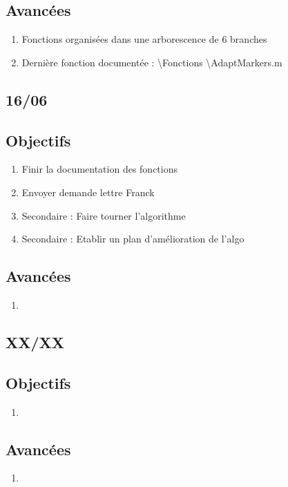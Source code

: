 \documentclass{article}
\begin{document}
\subsection*{\textbf{Avancées}}
\begin{enumerate}
    \item Fonctions organisées dans une arborescence de 6 branches
    \item Dernière fonction documentée : \textbackslash Fonctions \textbackslash AdaptMarkers.m
\end{enumerate}


\subsection*{16/06}

\subsection*{\textbf{Objectifs}}
\begin{enumerate}
    \item Finir la documentation des fonctions
    \item Envoyer demande lettre Franck
    \item Secondaire : Faire tourner l'algorithme
    \item Secondaire : Etablir un plan d'amélioration de l'algo
\end{enumerate}

\subsection*{\textbf{Avancées}}
\begin{enumerate}
    \item 
\end{enumerate}



\subsection*{XX/XX}

\subsection*{\textbf{Objectifs}}
\begin{enumerate}
    \item 
\end{enumerate}

\subsection*{\textbf{Avancées}}
\begin{enumerate}
    \item 
\end{enumerate}
\end{document}

